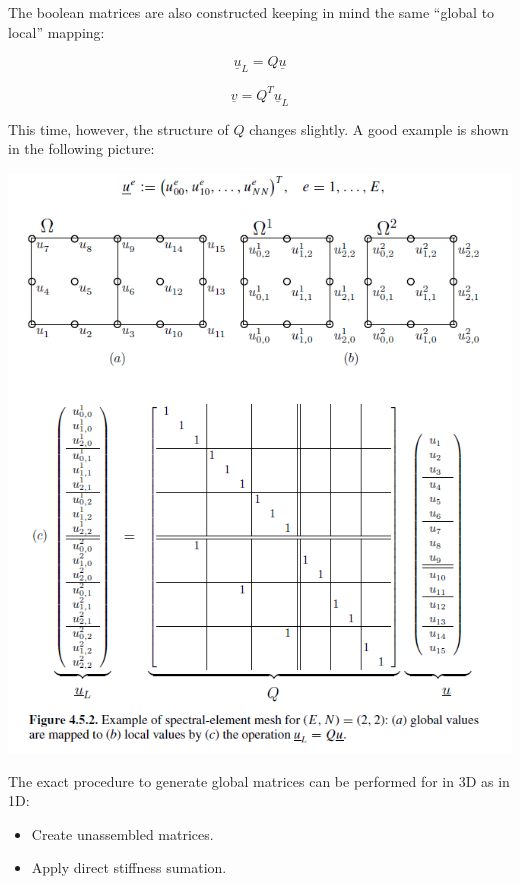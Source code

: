 \documentclass[
  a4paper,
  10pt]{article}
\providecommand{\tightlist}{%
  \setlength{\itemsep}{0pt}\setlength{\parskip}{0pt}}
\begin{document}
The boolean matrices are also constructed keeping in mind the same
``global to local'' mapping:

\begin{equation}
    \underline{u}_L=Q\underline{u}
\end{equation}

\begin{equation}
    \underline{v}=Q^{T}\underline{u}_L
\end{equation}

This time, however, the structure of \(Q\) changes slightly. A good
example is shown in the following picture:

\includegraphics{figs/ac1478334cdfb6c40bd089302ca686c9a0b9eae5.png}

The exact procedure to generate global matrices can be performed for in
3D as in 1D:

\begin{itemize}
\tightlist
\item
  Create unassembled matrices.
\item
  Apply direct stiffness sumation.
\end{itemize}
\end{document}
